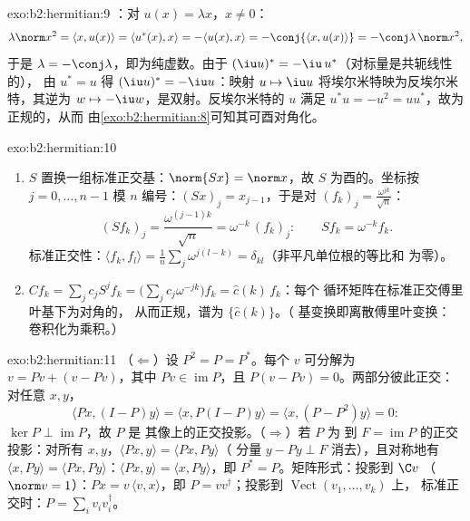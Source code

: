 \begin{solution}{exo:b2:hermitian:9}
：对 $u(x) = \lambda x$，$x \neq 0$：
\[
\lambda\norm x^2 = \langle x, u(x)\rangle
= \langle u^*(x), x\rangle = -\langle u(x), x\rangle
= -\conj{\langle x, u(x)\rangle} = -\conj\lambda\,\norm x^2 ,
\]
于是 $\lambda = -\conj\lambda$，即为纯虚数。由于 $(\iu
u)^* = -\iu\,u^*$（对标量是共轭线性的），
由 $u^* = u$ 得 $(\iu u)^* = -\iu u$：映射 $u \mapsto \iu u$
将埃尔米特映为反埃尔米特，其逆为 $w \mapsto -\iu
w$，是双射。反埃尔米特的 $u$ 满足 $u^*u = -u^2 =
uu^*$，故为正规的，从而
由\cref{exo:b2:hermitian:8}可知其可酉对角化。
\end{solution}

\begin{solution}{exo:b2:hermitian:10}
\begin{enumerate}
  \item $S$ 置换一组标准正交基：$\norm{Sx} = \norm
        x$，故 $S$ 为酉的。坐标按 $j = 0,
        \dots, n-1$ 模 $n$ 编号：$(Sx)_j = x_{j-1}$，于是对
        $(f_k)_j = \frac{\omega^{jk}}{\sqrt n}$：
        \[
        (Sf_k)_j = \frac{\omega^{(j-1)k}}{\sqrt n}
        = \omega^{-k}\,(f_k)_j :
        \qquad Sf_k = \omega^{-k}f_k .
        \]
        标准正交性：$\langle f_k, f_l\rangle = \frac1n
        \sum_j \omega^{j(l-k)} = \delta_{kl}$（非平凡单位根的等比和
        为零）。
  \item $Cf_k = \sum_j c_j S^jf_k = \bigl(\sum_j
        c_j\omega^{-jk}\bigr)f_k = \widehat c(k)\,f_k$：每个
        循环矩阵在标准正交傅里叶基下为对角的，
        从而正规，谱为 $\{\widehat c(k)\}$。（
        基变换即离散傅里叶变换：
        卷积化为乘积。）
\end{enumerate}
\end{solution}

\begin{solution}{exo:b2:hermitian:11}
（$\Leftarrow$）设 $P^2 = P = P^*$。每个 $v$ 可分解为 $v = Pv
+ (v - Pv)$，其中 $Pv \in \operatorname{im} P$，且 $P(v - Pv) =
0$。两部分彼此正交：对任意 $x, y$，
\[
\langle Px, (I - P)y\rangle = \langle x, P(I-P)y\rangle
= \langle x, (P - P^2)y\rangle = 0 :
\]
$\ker P \perp \operatorname{im} P$，故 $P$ 是
其像上的正交投影。（$\Rightarrow$）若 $P$ 为
到 $F = \operatorname{im}P$ 的正交投影：对所有
$x, y$，$\langle Px, y\rangle = \langle Px, Py\rangle$（
分量 $y - Py \perp F$ 消去），且对称地有 $\langle
x, Py\rangle = \langle Px, Py\rangle$：$\langle Px, y\rangle =
\langle x, Py\rangle$，即 $P^* = P$。矩阵形式：投影到 $\C v$
（$\norm v = 1$）：$Px = v\,\langle v, x\rangle$，即 $P =
vv^\dagger$；投影到 $\operatorname{Vect}(v_1, \dots, v_k)$ 上，
标准正交时：$P = \sum_i v_iv_i^\dagger$。
\end{solution}

